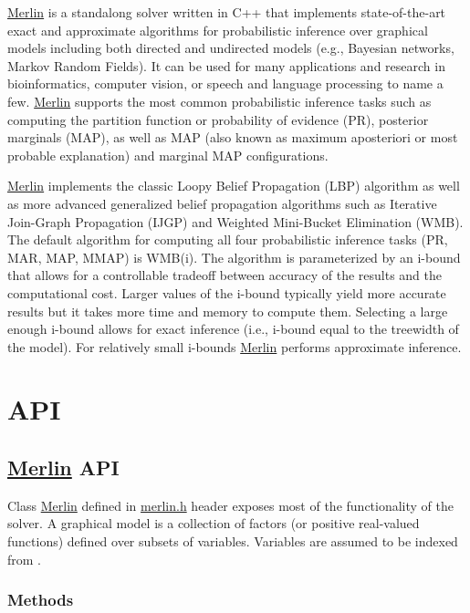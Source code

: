\hyperlink{classMerlin}{Merlin} is a standalong solver written in {\ttfamily C++} that implements state-\/of-\/the-\/art exact and approximate algorithms for probabilistic inference over graphical models including both directed and undirected models (e.\+g., Bayesian networks, Markov Random Fields). It can be used for many applications and research in bioinformatics, computer vision, or speech and language processing to name a few. \hyperlink{classMerlin}{Merlin} supports the most common probabilistic inference tasks such as computing the partition function or probability of evidence (PR), posterior marginals (M\+AP), as well as M\+AP (also known as maximum aposteriori or most probable explanation) and marginal M\+AP configurations.

\hyperlink{classMerlin}{Merlin} implements the classic Loopy Belief Propagation (L\+BP) algorithm as well as more advanced generalized belief propagation algorithms such as Iterative Join-\/\+Graph Propagation (I\+J\+GP) and Weighted Mini-\/\+Bucket Elimination (W\+MB). The default algorithm for computing all four probabilistic inference tasks (PR, M\+AR, M\+AP, M\+M\+AP) is W\+M\+B(i). The algorithm is parameterized by an i-\/bound that allows for a controllable tradeoff between accuracy of the results and the computational cost. Larger values of the i-\/bound typically yield more accurate results but it takes more time and memory to compute them. Selecting a large enough i-\/bound allows for exact inference (i.\+e., i-\/bound equal to the treewidth of the model). For relatively small i-\/bounds \hyperlink{classMerlin}{Merlin} performs approximate inference.

\section*{A\+PI}

\subsection*{\hyperlink{classMerlin}{Merlin} A\+PI}

Class {\ttfamily \hyperlink{classMerlin}{Merlin}} defined in {\ttfamily \hyperlink{merlin_8h}{merlin.\+h}} header exposes most of the functionality of the solver. A graphical model is a collection of factors (or positive real-\/valued functions) defined over subsets of variables. Variables are assumed to be indexed from {}.

\subsubsection*{Methods}


